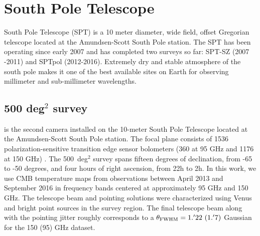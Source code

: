 \section{South Pole Telescope}
\label{sec_SPT}
South Pole Telescope (SPT) is a 10 meter diameter, wide field, offset Gregorian telescope \citep[SPT,][]{padin08, carlstrom11} located at the Amundsen-Scott South Pole station.
The SPT has been operating since early 2007 and has completed two surveys so far: SPT-SZ (2007 -2011) and SPTpol (2012-2016).  
Extremely dry and stable atmosphere of the south pole makes it one of the best available sites on Earth for observing millimeter and sub-millimeter wavelengths. 

\subsection{\sptpol{} {\rm 500} deg$^{2}$ survey}\label{sec_sptpol}
\sptpol{} is the second camera installed on the \mbox{10-meter} South Pole Telescope \citep[SPT,][]{padin08, carlstrom11} located at the Amundsen-Scott South Pole station.
The \sptpol{} focal plane consists of 1536 polarization-sensitive transition edge sensor bolometers (360 at 95 GHz and 1176 at 150 GHz) \citep{austermann12}.
The \sptpol{} 500~deg$^{2}$ survey spans fifteen degrees of declination, from -65 to -50 degrees, and four hours of right ascension, from 22h to 2h. 
In this work, we use CMB temperature maps from observations between April 2013 and September 2016 in frequency bands centered at approximately 95 GHz and 150 GHz. 
The telescope beam and pointing solutions were characterized using Venus and bright point sources in the \sptpol{} survey region. 
The final telescope beam along with the pointing jitter roughly corresponds to a $\theta_{\rm FWHM} = 1.^{\prime}22\ (1.^{\prime}7)$ Gaussian for the 150 (95) GHz dataset.

